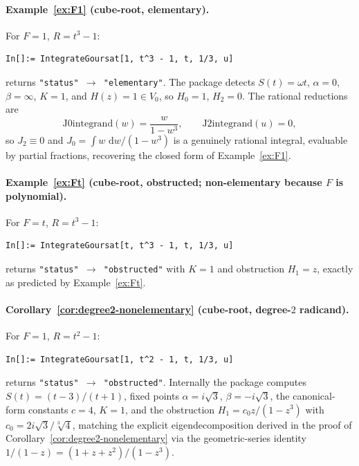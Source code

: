 \documentclass[11pt,a4paper]{article}
\theoremstyle{plain}
\theoremstyle{definition}
\theoremstyle{remark}
\renewcommand{\d}{\,\mathrm{d}}
\begin{document}
\paragraph{Example~\ref{ex:F1} (cube-root, elementary).} For $F=1$, $R=t^3-1$:
\begin{lstlisting}[basicstyle=\footnotesize\ttfamily,frame=none]
In[]:= IntegrateGoursat[1, t^3 - 1, t, 1/3, u]
\end{lstlisting}
returns \texttt{"status"\,$\to$\,"elementary"}. The package detects $S(t) = \omega t$, $\alpha=0$, $\beta=\infty$, $K=1$, and $H(z) = 1 \in V_0$, so $H_0 = 1$, $H_2 = 0$. The rational reductions are
\[
  \text{J0integrand}(w) = \frac{w}{1-w^3},\qquad \text{J2integrand}(u) = 0,
\]
so $J_2 \equiv 0$ and $J_0 = \int w\,\d w/(1-w^3)$ is a genuinely rational integral, evaluable by partial fractions, recovering the closed form of Example~\ref{ex:F1}.

\paragraph{Example~\ref{ex:Ft} (cube-root, obstructed; non-elementary because $F$ is polynomial).} For $F=t$, $R=t^3-1$:
\begin{lstlisting}[basicstyle=\footnotesize\ttfamily,frame=none]
In[]:= IntegrateGoursat[t, t^3 - 1, t, 1/3, u]
\end{lstlisting}
returns \texttt{"status"\,$\to$\,"obstructed"} with $K=1$ and obstruction $H_1 = z$, exactly as predicted by Example~\ref{ex:Ft}.

\paragraph{Corollary~\ref{cor:degree2-nonelementary} (cube-root, degree-$2$ radicand).} For $F=1$, $R=t^2-1$:
\begin{lstlisting}[basicstyle=\footnotesize\ttfamily,frame=none]
In[]:= IntegrateGoursat[1, t^2 - 1, t, 1/3, u]
\end{lstlisting}
returns \texttt{"status"\,$\to$\,"obstructed"}. Internally the package computes $S(t)=(t-3)/(t+1)$, fixed points $\alpha=i\sqrt{3}$, $\beta=-i\sqrt{3}$, the canonical-form constants $c=4$, $K=1$, and the obstruction $H_1 = c_0 z/(1-z^3)$ with $c_0 = 2i\sqrt{3}/\sqrt[3]{4}$, matching the explicit eigendecomposition derived in the proof of Corollary~\ref{cor:degree2-nonelementary} via the geometric-series identity $1/(1-z) = (1+z+z^2)/(1-z^3)$.
\end{document}
